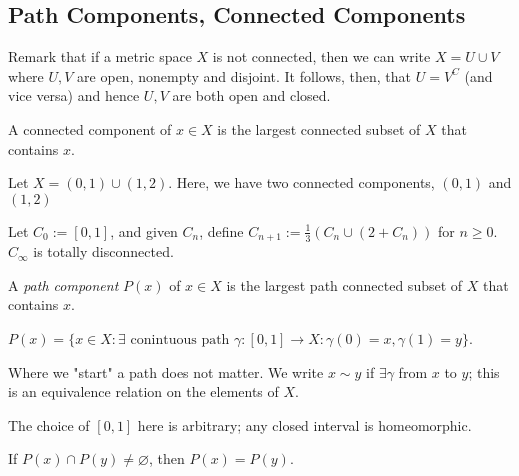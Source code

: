 \subsection{Path Components, Connected Components}
\begin{remark}
    Remark that if a metric space $X$ is not connected, then we can write $X = U \cup V$ where $U, V$ are open, nonempty and disjoint. It follows, then, that $U = V^C$ (and vice versa) and hence $U,V$ are both open and closed.
\end{remark}

\begin{definition}
    A connected component of $x \in X$ is the largest connected subset of $X$ that contains $x$.
\end{definition}

\begin{example}
    Let $X = (0, 1) \cup (1, 2)$. Here, we have two connected components, $(0,1)$ and $(1, 2)$
\end{example}

\begin{example}
    Let $C_0 := [0, 1]$, and given $C_n$, define $C_{n+1} := \frac{1}{3}\left(C_{n} \cup (2 +C_{n})\right)$ for $n \geq 0$. $C_\infty$ is totally disconnected.
\end{example}

\begin{definition}
    A \emph{path component} $P(x)$ of $x \in X$ is the largest path connected subset of $X$ that contains $x$.
\end{definition}

\begin{proposition}
    $P(x) = \{x \in X : \exists \text{ conintuous path } \gamma: [0, 1] \to X : \gamma(0) = x, \gamma (1) = y\}$.
\end{proposition}

\begin{remark}
    Where we "start" a path does not matter. We write $x \sim y$ if $\exists \gamma$ from $x$ to $y$; this is an equivalence relation on the elements of $X$.
\end{remark}

\begin{remark}
    The choice of $[0, 1]$ here is arbitrary; any closed interval is homeomorphic.
\end{remark}

\begin{lemma}
    If $P(x) \cap P(y) \neq \varnothing$, then $P(x) = P(y)$.
\end{lemma}

